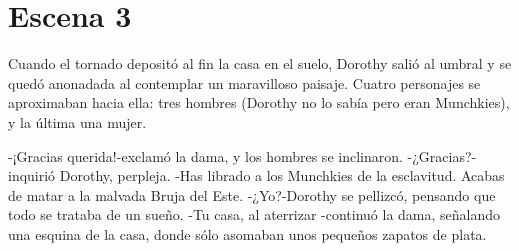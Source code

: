 \chapter{Escena 3}

Cuando el tornado depositó al fin la casa en el suelo, Dorothy salió al umbral y se quedó anonadada al contemplar un maravilloso paisaje. Cuatro personajes se aproximaban hacia ella: tres hombres (Dorothy no lo sabía pero eran Munchkies), y la última una mujer.

-¡Gracias querida!-exclamó la dama, y los hombres se inclinaron.
-¿Gracias?-inquirió Dorothy, perpleja.
-Has librado a los Munchkies de la esclavitud. Acabas de matar a la malvada Bruja del Este.
-¿Yo?-Dorothy se pellizcó, pensando que todo se trataba de un sueño.
-Tu casa, al aterrizar -continuó la dama, señalando una esquina de la casa, donde sólo asomaban unos pequeños zapatos de plata.
